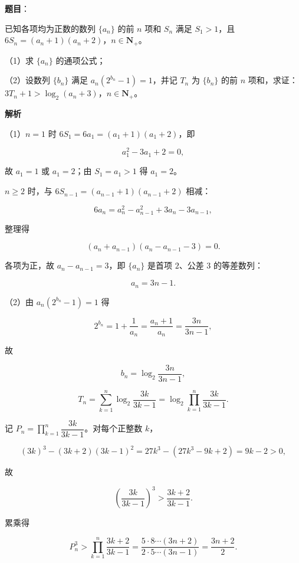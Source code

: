 \begin{answer}

\textbf{题目}：

已知各项均为正数的数列 $\{a_n\}$ 的前 $n$ 项和 $S_n$ 满足 $S_1>1$，且 $6S_n=(a_n+1)(a_n+2)$，$n\in\mathbf N_+$。

（1）求 $\{a_n\}$ 的通项公式；

（2）设数列 $\{b_n\}$ 满足 $a_n(2^{b_n}-1)=1$，并记 $T_n$ 为 $\{b_n\}$ 的前 $n$ 项和，求证：$3T_n+1>\log_2(a_n+3)$，$n\in\mathbf N_+$。

\textbf{解析}

（1）$n=1$ 时 $6S_1=6a_1=(a_1+1)(a_1+2)$，即

\nopagebreak[4]
\[a_1^2-3a_1+2=0,\]

故 $a_1=1$ 或 $a_1=2$；由 $S_1=a_1>1$ 得 $a_1=2$。

$n\geqslant2$ 时，与 $6S_{n-1}=(a_{n-1}+1)(a_{n-1}+2)$ 相减：

\nopagebreak[4]
\[6a_n=a_n^2-a_{n-1}^2+3a_n-3a_{n-1},\]

整理得

\nopagebreak[4]
\[(a_n+a_{n-1})(a_n-a_{n-1}-3)=0.\]

各项为正，故 $a_n-a_{n-1}=3$，即 $\{a_n\}$ 是首项 $2$、公差 $3$ 的等差数列：

\nopagebreak[4]
\[a_n=3n-1.\]

（2）由 $a_n(2^{b_n}-1)=1$ 得

\nopagebreak[4]
\[2^{b_n}=1+\frac1{a_n}=\frac{a_n+1}{a_n}=\frac{3n}{3n-1},\]

故

\nopagebreak[4]
\[b_n=\log_2\frac{3n}{3n-1},\]

\nopagebreak[4]
\[T_n=\sum_{k=1}^n\log_2\frac{3k}{3k-1}=\log_2\prod_{k=1}^n\frac{3k}{3k-1}.\]

记 $P_n=\prod_{k=1}^{n}\dfrac{3k}{3k-1}$。对每个正整数 $k$，

\nopagebreak[4]
\[(3k)^3-(3k+2)(3k-1)^2=27k^3-(27k^3-9k+2)=9k-2>0,\]

故

\nopagebreak[4]
\[\left(\frac{3k}{3k-1}\right)^3>\frac{3k+2}{3k-1}.\]

累乘得

\nopagebreak[4]
\[P_n^3>\prod_{k=1}^n\frac{3k+2}{3k-1}=\frac{5\cdot8\cdots(3n+2)}{2\cdot5\cdots(3n-1)}=\frac{3n+2}2.\]


\end{answer}
